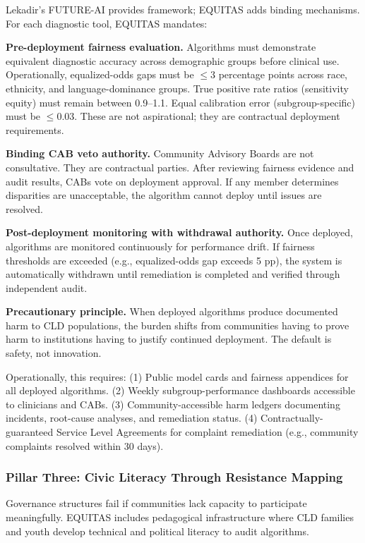 \documentclass[12pt,a4paper]{article}
\begin{document}
Lekadir's FUTURE-AI provides framework; EQUITAS adds binding mechanisms. For each diagnostic tool, EQUITAS mandates:

\textbf{Pre-deployment fairness evaluation.} Algorithms must demonstrate equivalent diagnostic accuracy across demographic groups before clinical use. Operationally, equalized-odds gaps must be $\leq 3$ percentage points across race, ethnicity, and language-dominance groups. True positive rate ratios (sensitivity equity) must remain between 0.9--1.1. Equal calibration error (subgroup-specific) must be $\leq 0.03$. These are not aspirational; they are contractual deployment requirements.

\textbf{Binding CAB veto authority.} Community Advisory Boards are not consultative. They are contractual parties. After reviewing fairness evidence and audit results, CABs vote on deployment approval. If any member determines disparities are unacceptable, the algorithm cannot deploy until issues are resolved.

\textbf{Post-deployment monitoring with withdrawal authority.} Once deployed, algorithms are monitored continuously for performance drift. If fairness thresholds are exceeded (e.g., equalized-odds gap exceeds 5 pp), the system is automatically withdrawn until remediation is completed and verified through independent audit.

\textbf{Precautionary principle.} When deployed algorithms produce documented harm to CLD populations, the burden shifts from communities having to prove harm to institutions having to justify continued deployment. The default is safety, not innovation.

Operationally, this requires: (1) Public model cards and fairness appendices for all deployed algorithms. (2) Weekly subgroup-performance dashboards accessible to clinicians and CABs. (3) Community-accessible harm ledgers documenting incidents, root-cause analyses, and remediation status. (4) Contractually-guaranteed Service Level Agreements for complaint remediation (e.g., community complaints resolved within 30 days).

\subsubsection{Pillar Three: Civic Literacy Through Resistance Mapping}

Governance structures fail if communities lack capacity to participate meaningfully. EQUITAS includes pedagogical infrastructure where CLD families and youth develop technical and political literacy to audit algorithms.
\end{document}
